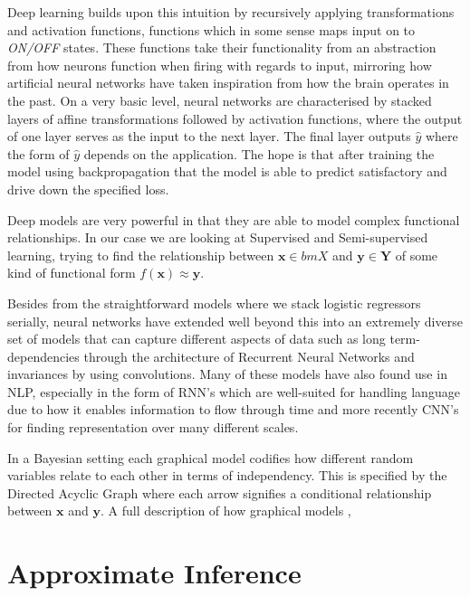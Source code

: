 Deep learning builds upon this intuition by recursively applying transformations
and activation functions, functions which in some sense maps input on to
\textit{ON/OFF} states. These functions take their functionality from an
abstraction from how neurons function when firing with regards to input,
mirroring how artificial neural networks have taken inspiration from how the
brain operates in the past. On a very basic level, neural networks are
characterised by stacked layers of affine transformations followed by activation
functions, where the output of one layer serves as the input to the next layer.
The final layer outputs $\hat{y}$ where the form of $\hat{y}$ depends on the application.
The hope is that after training the model using
backpropagation\cite{Rumelhart:1995:BBT:201784.201785} that the model is able to
predict satisfactory and drive down the specified loss.

Deep models are very powerful in that they are able to model complex functional
relationships. In our case we are looking at Supervised and Semi-supervised
learning, trying to find the relationship between $\bm{x} \in bm{X}$ and $\bm{y}
\in \bm{Y}$ of some kind of functional form $f(\bm{x}) \approx \bm{y}$.

Besides from the straightforward models where we stack logistic regressors
serially, neural networks have extended well beyond this into an extremely
diverse set of models that can capture different aspects of data such as long
term-dependencies through the architecture of Recurrent Neural Networks and
invariances by using convolutions. Many of these models have also found use in
NLP, especially in the form of RNN's which are well-suited for handling
language due to how it enables information to flow through
time\cite{graves_generating_2013}\cite{cho_learning_2014} and more recently
CNN's for finding representation over many different
scales\cite{semeniuta_hybrid_2017}\cite{yang_improved_2017}\cite{gehring_convolutional_2016}.

In a Bayesian setting each graphical model codifies how different random variables relate
to each other in terms of independency. This is specified by the Directed
Acyclic Graph where each arrow signifies a conditional relationship between
$\bm{x}$ and $\bm{y}$. A full description of how graphical models ,

\section{Approximate Inference}

